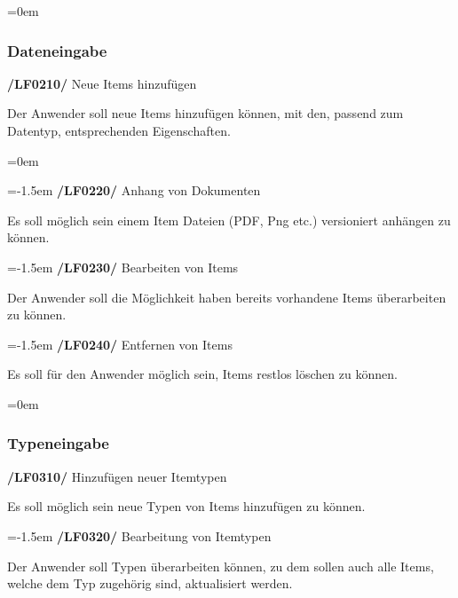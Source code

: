 \documentclass[11pt,a4paper]{report}
\begin{document}
\leftskip=0em
\subsubsection{Dateneingabe}
\textbf{/LF0210/} Neue Items hinzufügen
\par
\begingroup
\leftskip=1cm
\noindent Der Anwender soll neue Items hinzufügen können, mit den, passend zum Datentyp, entsprechenden Eigenschaften.\\
\par
\endgroup

\leftskip=0em

\leftskip=-1.5em
\textbf{/LF0220/} Anhang von Dokumenten
\par
\begingroup
\leftskip=1cm
\noindent Es soll möglich sein einem Item Dateien (PDF, Png etc.) versioniert anhängen zu können.\\
\par
\endgroup

\leftskip=-1.5em
\textbf{/LF0230/} Bearbeiten von Items
\par
\begingroup
\leftskip=1cm
\noindent Der Anwender soll die Möglichkeit haben bereits vorhandene Items überarbeiten zu können.\\
\par
\endgroup

\leftskip=-1.5em
\textbf{/LF0240/} Entfernen von Items
\par
\begingroup
\leftskip=1cm
\noindent Es soll für den Anwender möglich sein, Items restlos löschen zu können.\\
\par
\endgroup

\leftskip=0em
\subsubsection{Typeneingabe}

\textbf{/LF0310/} Hinzufügen neuer Itemtypen
\par
\begingroup
\leftskip=1cm
\noindent Es soll möglich sein neue Typen von Items hinzufügen zu können.\\
\par
\endgroup

\leftskip=-1.5em
\textbf{/LF0320/} Bearbeitung von Itemtypen
\par
\begingroup
\leftskip=1cm
\noindent Der Anwender soll Typen überarbeiten können, zu dem sollen auch alle Items, welche dem Typ zugehörig sind, aktualisiert werden.\\
\par
\endgroup
\end{document}
